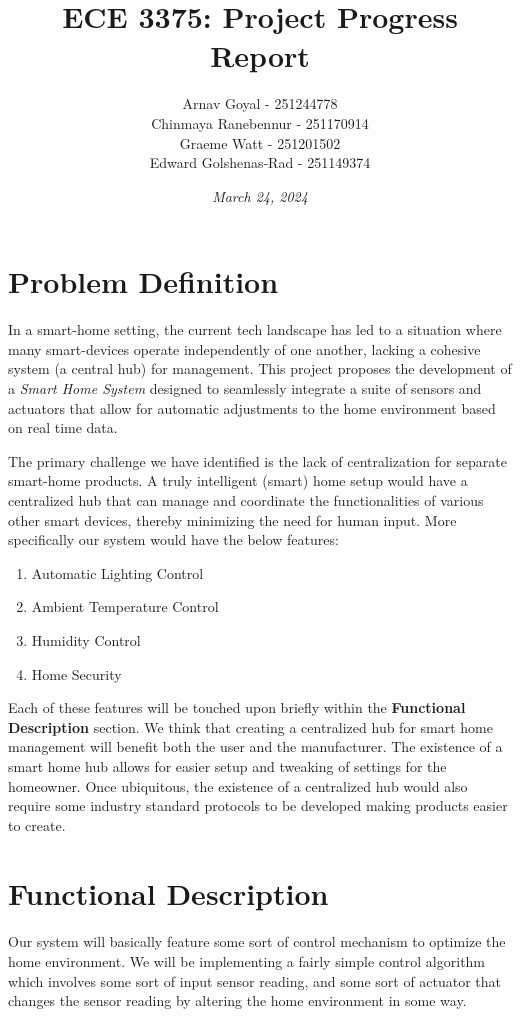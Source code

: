 \documentclass[]{report}
\title{\textbf{ECE 3375: Project Progress Report}}
\date{\textit{March 24, 2024}}
\author{
	Arnav Goyal - 251244778 \\
	Chinmaya Ranebennur - 251170914 \\
	Graeme Watt - 251201502 \\
	Edward Golshenas-Rad - 251149374
}
\begin{document}
	
\maketitle

\section*{Problem Definition}

In a smart-home setting, the current tech landscape has led to a situation where many smart-devices operate independently of one another, lacking a cohesive system (a central hub) for management. This project proposes the development of a \textit{Smart Home System} designed to seamlessly integrate a suite of sensors and actuators that allow for automatic adjustments to the home environment based on real time data.

The primary challenge we have identified is the lack of centralization for separate smart-home products. A truly intelligent (smart) home setup would have a centralized hub that can manage and coordinate the functionalities of various other smart devices, thereby minimizing the need for human input. More specifically our system would have the below features:
\begin{enumerate}
	\item Automatic Lighting Control
	\item Ambient Temperature Control
	\item Humidity Control
	\item Home Security
\end{enumerate}
Each of these features will be touched upon briefly within the \textbf{Functional Description} section. We think that creating a centralized hub for smart home management will benefit both the user and the manufacturer. The existence of a smart home hub allows for easier setup and tweaking of settings for the homeowner. Once ubiquitous, the existence of a centralized hub would also require some industry standard protocols to be developed making products easier to create.

\section*{Functional Description}
Our system will basically feature some sort of control mechanism to optimize the home environment. We will be implementing a fairly simple control algorithm which involves some sort of input sensor reading, and some sort of actuator that changes the sensor reading by altering the home environment in some way.
\end{document}
